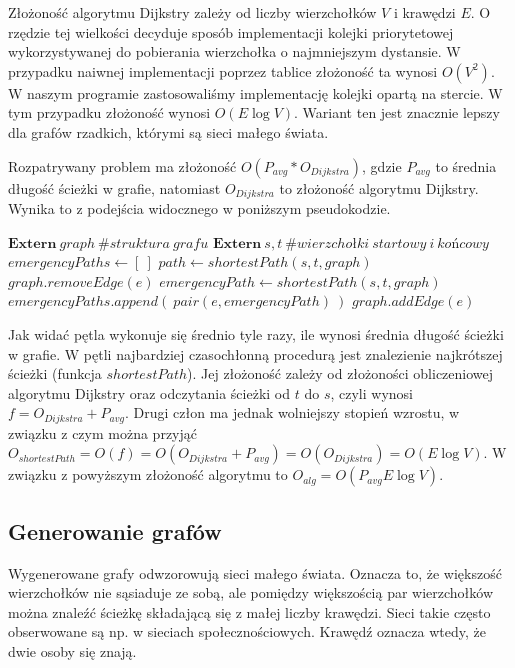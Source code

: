 \documentclass[a4paper, 12pt]{article}
\begin{document}
Złożoność algorytmu Dijkstry zależy od liczby wierzchołków $V$ i krawędzi $E$. O rzędzie tej wielkości decyduje sposób implementacji kolejki priorytetowej wykorzystywanej do pobierania wierzchołka o najmniejszym dystansie. W przypadku naiwnej implementacji poprzez tablice złożoność ta wynosi $O(V^2)$. W naszym programie zastosowaliśmy implementację kolejki opartą na stercie. W tym przypadku złożoność wynosi $O(E \log V)$. Wariant ten jest znacznie lepszy dla grafów rzadkich, którymi są sieci małego świata.

Rozpatrywany problem ma złożoność $O(P_{avg}*O_{Dijkstra})$, gdzie $P_{avg}$ to średnia długość ścieżki w grafie, natomiast $O_{Dijkstra}$ to złożoność algorytmu Dijkstry. Wynika to z podejścia widocznego w poniższym pseudokodzie.
\begin{algorithmic}
\State $\mathbf{Extern}\ graph\ \mathit{\# struktura\ grafu}$
\State $\mathbf{Extern}\ s, t\ \mathit{\# wierzchołki\ startowy\ i\ końcowy}$
\State
\State $emergencyPaths \gets [\ ]$
 \State $path \gets shortestPath(s, t, graph)$
\State $graph.removeEdge(e)$
\State $emergencyPath \gets shortestPath(s, t, graph)$
\State $emergencyPaths.append(\ pair(e, emergencyPath)\ )$
\State $graph.addEdge(e)$
\EndFor
\State {}
\end{algorithmic}
Jak widać pętla wykonuje się średnio tyle razy, ile wynosi średnia długość ścieżki w grafie. W pętli najbardziej czasochłonną procedurą jest znalezienie najkrótszej ścieżki (funkcja $shortestPath$). Jej złożoność zależy od złożoności obliczeniowej algorytmu Dijkstry oraz odczytania ścieżki od $t$ do $s$, czyli wynosi $f = O_{Dijkstra}+ P_{avg}$. Drugi człon ma jednak wolniejszy stopień wzrostu, w związku z czym można przyjąć $O_{shortestPath}=O(f)=O(O_{Dijkstra}+ P_{avg}) = O(O_{Dijkstra}) = O(E \log V)$.
W związku z powyższym złożoność algorytmu to $O_{alg} = O( P_{avg}E \log V)$.

\subsection{Generowanie grafów}
\label{generowanie}
Wygenerowane grafy odwzorowują sieci małego świata\cite{amaral2000classes}. Oznacza to, że większość wierzchołków nie sąsiaduje ze sobą, ale pomiędzy większością par wierzchołków można znaleźć ścieżkę składającą się z małej liczby krawędzi. Sieci takie często obserwowane są np. w sieciach społecznościowych. Krawędź oznacza wtedy, że dwie osoby się znają.
\end{document}
